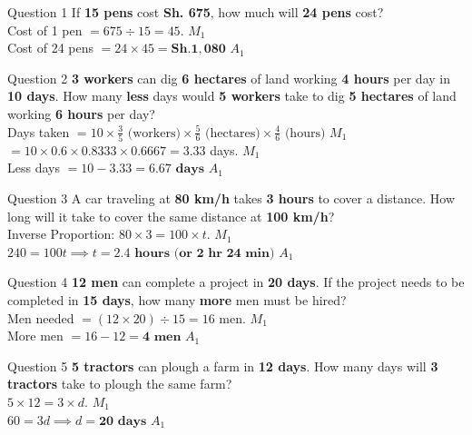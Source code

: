 \documentclass[12pt, a4paper, oneside]{article}
\begin{document}
\begin{solvingbox}{Question 1}
If \textbf{15 pens} cost \textbf{Sh. 675}, how much will \textbf{24 pens} cost? \\
Cost of 1 pen $= 675 \div 15 = 45$. \hfill $M_1$ \\
Cost of 24 pens $= 24 \times 45 = \mathbf{Sh. 1,080}$ \hfill $A_1$
\end{solvingbox}

\begin{solvingbox}{Question 2}
\textbf{3 workers} can dig \textbf{6 hectares} of land working \textbf{4 hours} per day in \textbf{10 days}. How many \textbf{less} days would \textbf{5 workers} take to dig \textbf{5 hectares} of land working \textbf{6 hours} per day? \\
Days taken $= 10 \times \frac{3}{5} \text{ (workers)} \times \frac{5}{6} \text{ (hectares)} \times \frac{4}{6} \text{ (hours)}$ \hfill $M_1$ \\
$= 10 \times 0.6 \times 0.8333 \times 0.6667 = 3.33$ days. \hfill $M_1$ \\
Less days $= 10 - 3.33 = \mathbf{6.67\text{ days}}$ \hfill $A_1$
\end{solvingbox}

\begin{solvingbox}{Question 3}
A car traveling at \textbf{80 km/h} takes \textbf{3 hours} to cover a distance. How long will it take to cover the same distance at \textbf{100 km/h}? \\
Inverse Proportion: $80 \times 3 = 100 \times t$. \hfill $M_1$ \\
$240 = 100t \implies t = \mathbf{2.4\text{ hours (or 2 hr 24 min)}}$ \hfill $A_1$
\end{solvingbox}

\begin{solvingbox}{Question 4}
\textbf{12 men} can complete a project in \textbf{20 days}. If the project needs to be completed in \textbf{15 days}, how many \textbf{more} men must be hired? \\
Men needed $= (12 \times 20) \div 15 = 16$ men. \hfill $M_1$ \\
More men $= 16 - 12 = \mathbf{4\text{ men}}$ \hfill $A_1$
\end{solvingbox}

\begin{solvingbox}{Question 5}
\textbf{5 tractors} can plough a farm in \textbf{12 days}. How many days will \textbf{3 tractors} take to plough the same farm? \\
$5 \times 12 = 3 \times d$. \hfill $M_1$ \\
$60 = 3d \implies d = \mathbf{20\text{ days}}$ \hfill $A_1$
\end{solvingbox}
\end{document}
